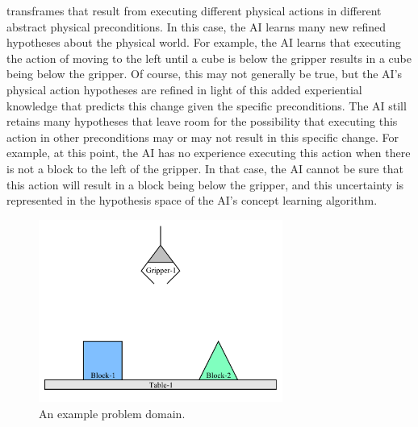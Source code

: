 transframes that result from executing different physical actions in
different abstract physical preconditions.  In this case, the AI
learns many new refined hypotheses about the physical world.  For
example, the AI learns that executing the action of moving to the left
until a cube is below the gripper results in a cube being below the
gripper.  Of course, this may not generally be true, but the AI's
physical action hypotheses are refined in light of this added
experiential knowledge that predicts this change given the specific
preconditions.  The AI still retains many hypotheses that leave room
for the possibility that executing this action in other preconditions
may or may not result in this specific change.  For example, at this
point, the AI has no experience executing this action when there is
not a block to the left of the gripper.  In that case, the AI cannot
be sure that this action will result in a block being below the
gripper, and this uncertainty is represented in the hypothesis space
of the AI's concept learning algorithm.
\begin{figure}
\begin{center}
\includegraphics[width=8cm]{gfx/blocks_world_example-1}
\end{center}
\caption[An example problem domain.]{An example problem domain.}
\label{figure:an_example_problem_domain}
\end{figure}
